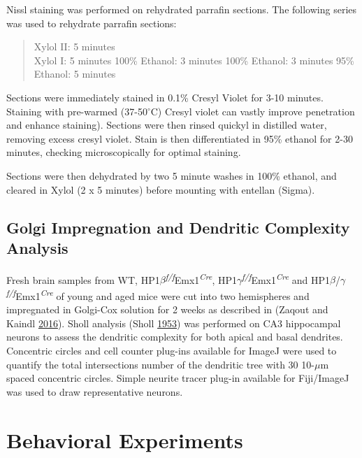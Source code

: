 \documentclass[onehalf,12pt]{beavtex}
\begin{document}
  Nissl staining was performed on rehydrated parrafin sections. The
  following series was used to rehydrate parrafin sections:
  
  \begin{quote}
  Xylol II: 5 minutes\\
  Xylol I: 5 minutes 100\% Ethanol: 3 minutes 100\% Ethanol: 3 minutes
  95\% Ethanol: 5 minutes
  \end{quote}
  
  Sections were immediately stained in 0.1\% Cresyl Violet for 3-10
  minutes. Staining with pre-warmed (37-50\(^\circ\)C) Cresyl violet can
  vastly improve penetration and enhance staining). Sections were then
  rinsed quickyl in distilled water, removing excess cresyl violet. Stain
  is then differentiated in 95\% ethanol for 2-30 minutes, checking
  microscopically for optimal staining.
  
  Sections were then dehydrated by two 5 minute washes in 100\% ethanol,
  and cleared in Xylol (2 x 5 minutes) before mounting with entellan
  (Sigma).
  
  \subsection{Golgi Impregnation and Dendritic Complexity
  Analysis}\label{golgi-impregnation-and-dendritic-complexity-analysis}
  
  Fresh brain samples from WT,
  HP1\(\beta\)\textsuperscript{\emph{f/f}}Emx1\textsuperscript{\emph{Cre}},
  HP1\(\gamma\)\textsuperscript{\emph{f/f}}Emx1\textsuperscript{\emph{Cre}}
  and
  HP1\(\beta\)/\(\gamma\)\textsuperscript{\emph{f/f}}Emx1\textsuperscript{\emph{Cre}}
  of young and aged mice were cut into two hemispheres and impregnated in
  Golgi-Cox solution for 2 weeks as described in (Zaqout and Kaindl
  \protect\hyperlink{ref-ZaqoutGolgiCoxStainingStep2016}{2016}). Sholl
  analysis (Sholl
  \protect\hyperlink{ref-ShollDendriticorganizationneurons1953}{1953}) was
  performed on CA3 hippocampal neurons to assess the dendritic complexity
  for both apical and basal dendrites. Concentric circles and cell counter
  plug-ins available for ImageJ were used to quantify the total
  intersections number of the dendritic tree with 30 10-\(\mu\)m spaced
  concentric circles. Simple neurite tracer plug-in available for
  Fiji/ImageJ was used to draw representative neurons.
  
  \section{Behavioral Experiments}\label{behavioral-experiments}
  
\end{document}
